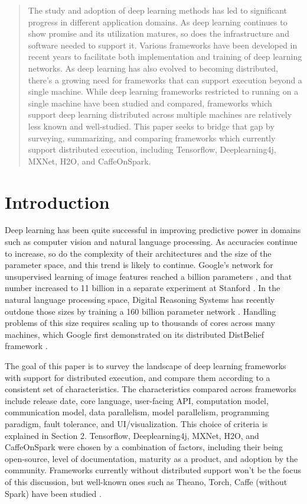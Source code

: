 \documentclass{article}
\begin{document}
\begin{abstract}
The study and adoption of deep learning methods has led to significant progress in different application domains. As deep learning continues to show promise and its utilization matures, so does the infrastructure and software needed to support it. Various frameworks have been developed in recent years to facilitate both implementation and training of deep learning networks. As deep learning has also evolved to becoming distributed, there's a growing need for frameworks that can support execution beyond a single machine. While deep learning frameworks restricted to running on a single machine have been studied and compared, frameworks which support deep learning distributed across multiple machines are relatively less known and well-studied. This paper seeks to bridge that gap by surveying, summarizing, and comparing frameworks which currently support distributed execution, including Tensorflow, Deeplearning4j, MXNet, H2O, and CaffeOnSpark. 
\end{abstract}

\section{Introduction}
Deep learning has been quite successful in improving predictive power in domains such as computer vision and natural language processing. As accuracies continue to  increase, so do the complexity of their architectures and the size of the parameter space, and this trend is likely to continue. Google's network for unsupervised learning of image features reached a billion parameters \cite{donahue2014decaf}, and that number increased to 11 billion in a separate experiment at Stanford \cite{schmidhuber2015deep}. In the natural language processing space, Digital Reasoning Systems has recently outdone those sizes by training a 160 billion parameter network \cite{trask2015modeling}. Handling problems of this size requires scaling up to thousands of cores across many machines, which Google first demonstrated on its distributed DistBelief framework \cite{dean2012large}.

The goal of this paper is to survey the landscape of deep learning frameworks with support for distributed execution, and compare them according to a consistent set of characteristics. The characteristics compared across frameworks include release date, core language, user-facing API, computation model, communication model, data parallelism, model parallelism, programming paradigm, fault tolerance, and UI/visualization. This choice of criteria is explained in Section 2. Tensorflow, Deeplearning4j, MXNet, H2O, and CaffeOnSpark were chosen by a combination of factors, including their being open-source, level of documentation, maturity as a product, and adoption by the community. Frameworks currently without distributed support won't be the focus of this discussion, but well-known ones such as Theano, Torch, Caffe (without Spark) have been studied \cite{DBLP:journals/corr/BahrampourRSS15}. 
\end{document}
